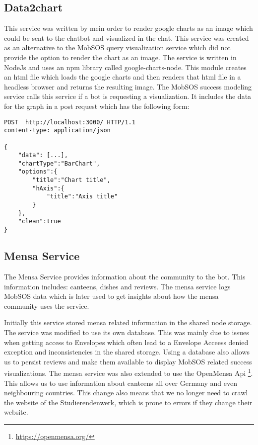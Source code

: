 \subsection{Data2chart}
This service was written by me\footnotemark in order to render google charts as an image which could be sent to the chatbot and visualized in the chat. This service was created as an alternative to the MobSOS query visualization service which did not provide the option to render the chart as an image. 
The service is written in NodeJs and uses an npm library called google-charts-node\footnotemark.
This module creates an html file which loads the google charts and then renders that html file in a headless browser \footnotemark and returns the resulting image.
The MobSOS success modeling service calls this service if a bot is requesting a visualization. It includes the data for the graph in a post request which has the following form:

\begin{lstlisting}
POST  http://localhost:3000/ HTTP/1.1
content-type: application/json

{
    "data": [...],
    "chartType":"BarChart",
    "options":{
        "title":"Chart title",
        "hAxis":{
            "title":"Axis title"
        }
    },
    "clean":true 
}
\end{lstlisting}

\subsection{Mensa Service}
The Mensa Service provides information about the community to the bot. This information includes: canteens, dishes and reviews. The mensa service logs MobSOS data which is later used to get insights about how the mensa community uses the service.

Initially this service stored mensa related information in the shared node storage. The service was modified to use its own database. This was mainly due to issues when getting access to Envelopes which often lead to a Envelope Acceess denied exception and inconsistencies in the shared storage. Using a database also allows us to persist reviews and make them available to display MobSOS related success visualizations.
The mensa service was also extended to use the OpenMensa Api \footnote{\url{https://openmensa.org/}}. This allows us to use information about canteens all over Germany and even neighbouring countries.
This change also means that we no longer need to crawl the website of the Studierendenwerk, which is prone to errors if they change their website. 

